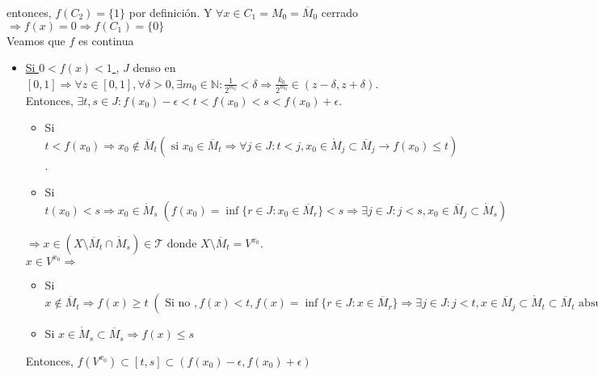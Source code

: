 \begin{dem}
\begin{enumerate}[label=(\roman*)]
      entonces, $f(C_{2}) = \{ 1 \}$ por definición. Y $\forall x \in C_{1} = M_{0} = \overline{M}_{0}$ cerrado $\Rightarrow f(x) = 0 \Rightarrow f(C_{1}) = \{ 0 \}$ \\

      Veamos que $f$ es continua

      \begin{itemize}
        \item \underline{ Si $0 < f(x) < 1$ }, $J$ denso en $[0,1] \Rightarrow \forall z \in [0,1], \forall \delta > 0, \exists m_{0} \in \mathbb{N} : \frac{1}{2^{m_{0}}} < \delta \Rightarrow \frac{k_{0}}{2^{m_{0}}} \in (z - \delta, z + \delta)$. Entonces, $\exists t, s \in J : f(x_{0}) - \epsilon < t < f(x_{0}) < s < f(x_{0}) + \epsilon$. \\
          \begin{itemize}
            \item Si $ t < f(x_{0}) \Rightarrow x_{0} \not \in \overline{M}_{t} (\text{ si } x_{0} \in \overline{M}_{t} \Rightarrow \forall j \in J: t < j, x_{0} \in \mathring{M}_{j} \subset \overline{M}_{j} \rightarrow f(x_{0}) \leq t )$.
            \item Si $t(x_{0}) < s \Rightarrow x_{0} \in \mathring{M}_{s} \; (f(x_{0}) = \inf \{  r \in J : x_{0} \in \overline{M}_{r} \} < s \Rightarrow \exists j \in J : j < s, x_{0} \in \overline{M}_{j} \subset \mathring{M}_{s})$
          \end{itemize}

      $\Rightarrow x \in (X \setminus \overline{M}_{t} \cap \mathring{M}_{s}) \in \mathcal{T}$ donde $X \setminus \overline{M}_{t} = V^{x_{0}}$. \\

      $x \in V^{x_{0}} \Rightarrow$
      \begin{itemize}
        \item Si $ x \not \in \overline{M}_{t} \Rightarrow f(x) \geq t \; (\text{ Si no }, f(x)<t, f(x) = \inf \{  r \in J : x \in \overline{M}_{r} \} \Rightarrow \exists j \in J: j< t, x \in \overline{M}_{j} \subset \mathring{M}_{t} \subset \overline{M}_{t} \text{ absurdo } )$ 
        \item Si $x \in \mathring{M}_{s} \subset \overline{M}_{s} \Rightarrow f(x) \leq s$
      \end{itemize}

      Entonces, $f(V^{x_{0}}) \subset [t, s] \subset (f(x_{0}) - \epsilon, f(x_{0}) + \epsilon)$


\end{itemize}
\end{enumerate}
\end{dem}
